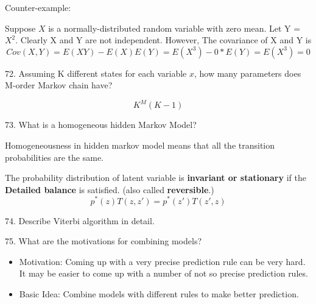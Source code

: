 \documentclass[11pt,a4paper]{article}
\newcommand{\BOLD}[1]{\textbf{#1}}
\begin{document}
    Counter-example: 

    Suppose $X$ is a normally-distributed random variable with zero mean.  Let Y = $X^2$.  Clearly X and Y are not independent.
    However, The covariance of X and Y is
    $$ Cov(X,Y) = E(XY) - E(X)E(Y) = E(X^3) - 0*E(Y) = E(X^3)  = 0 $$

72. Assuming K different states for each variable $x$, how many parameters does M-order Markov chain have?
    
    $$ K^M (K - 1)$$

73. What is a homogeneous hidden Markov Model?

    Homogeneousness in hidden markov model means that all the transition probabilities are the same.

    The probability distribution of latent variable is \BOLD{invariant or stationary} if the \BOLD{Detailed balance} is satisfied. (also called \BOLD{reversible}.)
    $$ p^{*}(z) T(z,z') = p^{*}(z')T(z', z) $$

74. Describe Viterbi algorithm in detail.

75. What are the motivations for combining models?
    \begin{itemize}
    \item Motivation: Coming up with a very precise prediction rule can be very hard. It may be easier to come up with a number of not so precise prediction rules.
    \item Basic Idea: Combine models with different rules to make better prediction.
        \end{itemize}
\end{document}

